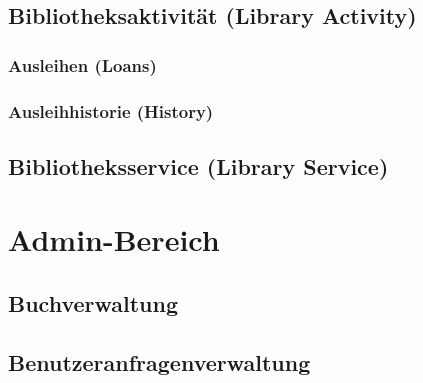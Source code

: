 \subsection{Bibliotheksaktivität (Library Activity)}

\subsubsection{Ausleihen (Loans)}

\subsubsection{Ausleihhistorie (History)}

\subsection{Bibliotheksservice (Library Service)}

\section{Admin-Bereich}

\subsection{Buchverwaltung}

\subsection{Benutzeranfragenverwaltung}

